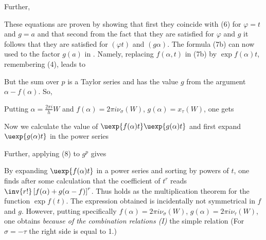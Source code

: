 Further,

These equations are proven by showing that first they coincide with (6) for $\varphi=t$ and $g=a$ and that second from the fact that they are satisfied for $\varphi$ and $g$ it follows that they are satisfied for $(\varphi t)$ and $(g\alpha)$. The formula (7b) can now  
 used to  the factor $g(a)$ in
. Namely, replacing $f(\alpha, t)$ in (7b) by $\exp{f(\alpha)t}$, remembering (4), leads to

But the sum over $p$ is a Taylor series and has the value $g$ from the argument $\alpha - f(\alpha)$. So, 

Putting $\alpha=\frac{2\pi i}{h}W$ and $f(\alpha) = 2\pi i\nu_\sigma(W)$, $g(\alpha) = x_\tau(W)$, one gets

Now we calculate the value of $\uexp{f(\alpha)t}\uexp{g(\alpha)t}$ and first expand $\uexp{g(\alpha)t}$ in the power series

Further, applying (8) to $g^p$ gives

By expanding $\uexp{f(\alpha)t}$ in a power series and sorting by powers of $t$, one finds after some calculation that the coefficient of $t^r$ reads $\inv{r!}\left[f(\alpha) + g(\alpha - f)\right]^r$. Thus
holds as the multiplication theorem for the function $\exp{f(t)}$. The expression obtained is incidentally not symmetrical in $f$ and $g$. However, putting specifically $f(\alpha) = 2\pi i \nu_\sigma(W)$, $g(\alpha) = 2\pi i \nu_\tau(W)$, one obtains \textit{because of the combination relations (I)} the simple relation
(For $\sigma = -\tau$ the right side is equal to 1.)

